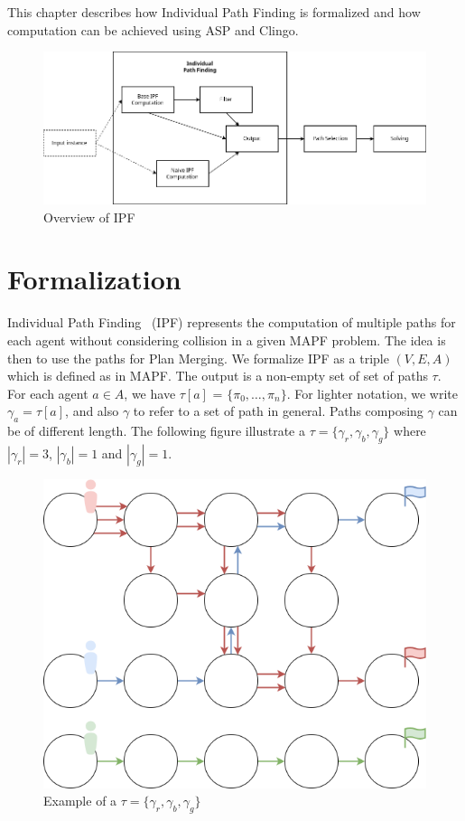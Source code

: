 \label{sec:ipf}
This chapter describes how Individual Path Finding is formalized and how computation can be achieved using ASP and Clingo. 

\begin{figure}[H]
    \centering
    \caption{Overview of IPF}\label{fig:overview_ipf}
    \includegraphics[width=\widthimg]{img/overview_ipf.drawio.png}
\end{figure}

\section{Formalization}

Individual Path Finding~\cite{luis2020plan,delling2009engineering} (IPF) represents the computation of multiple paths for each agent without considering collision in a given MAPF problem. The idea is then to use the paths for Plan Merging. We formalize IPF as a triple \((V,E,A)\) which is defined as in MAPF. The output is a non-empty set of set of paths \(\tau\). For each agent \(a \in A\), we have \(\tau[a]\) = \(\{\pi_0,\dots,\pi_n\}\). For lighter notation, we write \(\gamma_a = \tau[a]\), and also \(\gamma\) to refer to a set of path in general. Paths composing \(\gamma\) can be of different length. The following figure illustrate a \(\tau = \{\gamma_r, \gamma_b, \gamma_g\}\) where \(|\gamma_r|=3\), \(|\gamma_b|=1\) and  \(|\gamma_g|=1\). 

\begin{figure}[H]
    \centering
    \caption{Example of a \(\tau = \{\gamma_r, \gamma_b, \gamma_g\}\)}\label{fig:ipf_example}
    \includegraphics[width=\widthimg]{img/ipf_example.drawio.png}
\end{figure}


